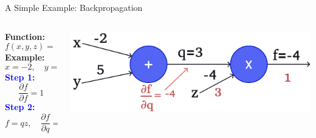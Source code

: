 \documentclass[serif, aspectratio=169]{beamer}
\begin{document}
\begin{frame}{A Simple Example: Backpropagation}

    \begin{columns}
       
        \begin{column}{0.3\textwidth}
            \vspace{-0.4cm}
            \textbf{Function:} 
            \[
            f(x, y, z) = (x + y)z
            \]
            \textbf{Example:} 
            \[
            x = -2, \quad y = 5, \quad z = -4
            \]
             \vspace{-0.4cm}
            \textcolor{blue}{\textbf{Step 1:}}
            \[
            \frac{\partial f}{\partial f} = 1
            \]
             \vspace{-0.4cm}
            \textcolor{blue}{\textbf{Step 2:}}
            \[
            f = qz, \quad
            \frac{\partial f}{\partial q} = z = -4, \quad \frac{\partial f}{\partial z} = q = 3
            \]
        \end{column}

        \begin{column}{0.7\textwidth}
                    \begin{center}
                \includegraphics[width=\textwidth, keepaspectratio]{pic/b5.jpg}
            \end{center}
        \end{column}

    \end{columns}

\end{frame}
\end{document}
